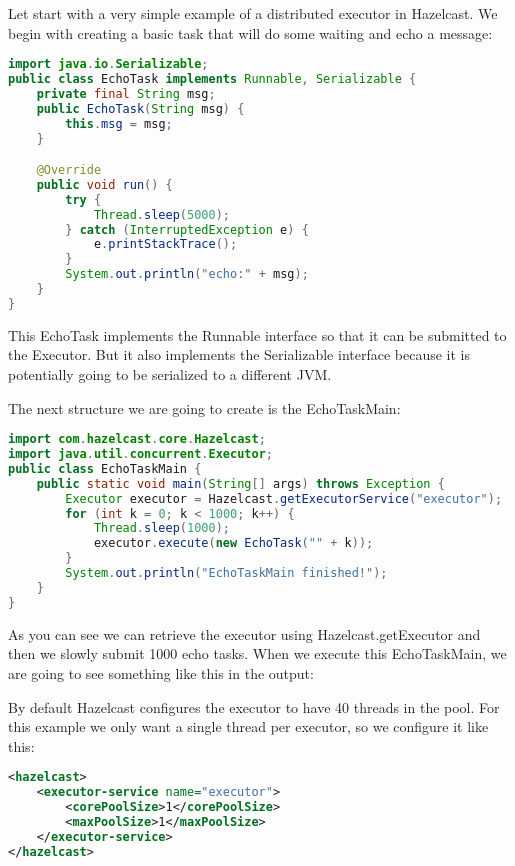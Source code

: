 Let start with a very simple example of a distributed executor in Hazelcast. We begin with creating a basic task that will do some waiting and echo a message:

\begin{lstlisting}[language=java]
import java.io.Serializable;
public class EchoTask implements Runnable, Serializable {
    private final String msg;
    public EchoTask(String msg) {
        this.msg = msg;
    }

    @Override
    public void run() {
        try {
            Thread.sleep(5000);
        } catch (InterruptedException e) {
            e.printStackTrace();
        }
        System.out.println("echo:" + msg);
    }
}
\end{lstlisting}

This EchoTask implements the Runnable interface so that it can be submitted to the Executor. But it also implements the Serializable interface because it is potentially going to be serialized to a different JVM. 

The next structure we are going to create is the EchoTaskMain:
\begin{lstlisting}[language=java]
import com.hazelcast.core.Hazelcast;
import java.util.concurrent.Executor;
public class EchoTaskMain {
    public static void main(String[] args) throws Exception {
        Executor executor = Hazelcast.getExecutorService("executor");
        for (int k = 0; k < 1000; k++) {
            Thread.sleep(1000);
            executor.execute(new EchoTask("" + k));
        }
        System.out.println("EchoTaskMain finished!");
    }
}
\end{lstlisting}
As you can see we can retrieve the executor using Hazelcast.getExecutor and then we slowly submit 1000 echo tasks. When we execute this EchoTaskMain, we are going to see something like this in the output:

By default Hazelcast configures the executor to have 40 threads in the pool. For this example we only want a single thread per executor, so we configure it like this:

\begin{lstlisting}[language=xml]
<hazelcast>
    <executor-service name="executor">
        <corePoolSize>1</corePoolSize>
        <maxPoolSize>1</maxPoolSize>
    </executor-service>
</hazelcast>
\end{lstlisting}

